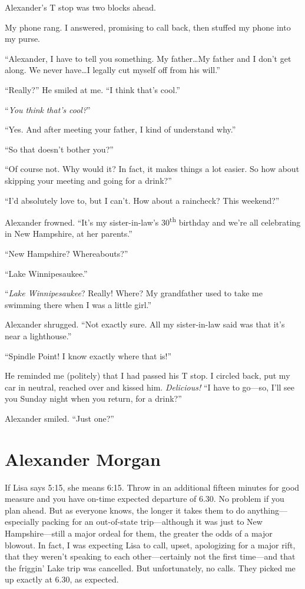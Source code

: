 Alexander's T stop was two blocks ahead.

My phone rang. I answered, promising to call back, then stuffed my phone
into my purse.

``Alexander, I have to tell you something. My father\ldots My father and
I don't get along. We never have\ldots I legally cut myself off from his
will.''

``Really?'' He smiled at me. ``I think that's cool.''

``\emph{You think} \emph{that's} \emph{cool?}''

``Yes. And after meeting your father, I kind of understand why.''

``So that doesn't bother you?''

``Of course not. Why would it? In fact, it makes things a lot easier. So
how about skipping your meeting and going for a drink?''

``I'd absolutely love to, but I can't. How about a raincheck? This
weekend?''

Alexander frowned. ``It's my sister-in-law's 30\textsuperscript{th}
birthday and we're all celebrating in New Hampshire, at her parents.''

``New Hampshire? Whereabouts?''

``Lake Winnipesaukee.''

``\emph{Lake Winnipesaukee}? Really! Where? My grandfather used to take
me swimming there when I was a little girl.''

Alexander shrugged. ``Not exactly sure. All my sister-in-law said was
that it's near a lighthouse.''

``Spindle Point! I know exactly where that is!''

He reminded me (politely) that I had passed his T stop. I circled back,
put my car in neutral, reached over and kissed him. \emph{Delicious!}
``I have to go---so, I'll see you Sunday night when you return, for a
drink?''

Alexander smiled. ``Just one?''

\chapter{Alexander Morgan}

\titlemark

If Lisa says 5:15, she means 6:15. Throw in an additional fifteen
minutes for good measure and you have on-time expected departure of
6.30. No problem if you plan ahead. But as everyone knows, the longer it
takes them to do anything---especially packing for an out-of-state
trip---although it was just to New Hampshire---still a major ordeal for
them, the greater the odds of a major blowout. In fact, I was expecting
Lisa to call, upset, apologizing for a major rift, that they weren't
speaking to each other---certainly not the first time---and that the
friggin' Lake trip was cancelled. But unfortunately, no calls. They
picked me up exactly at 6.30, as expected.

